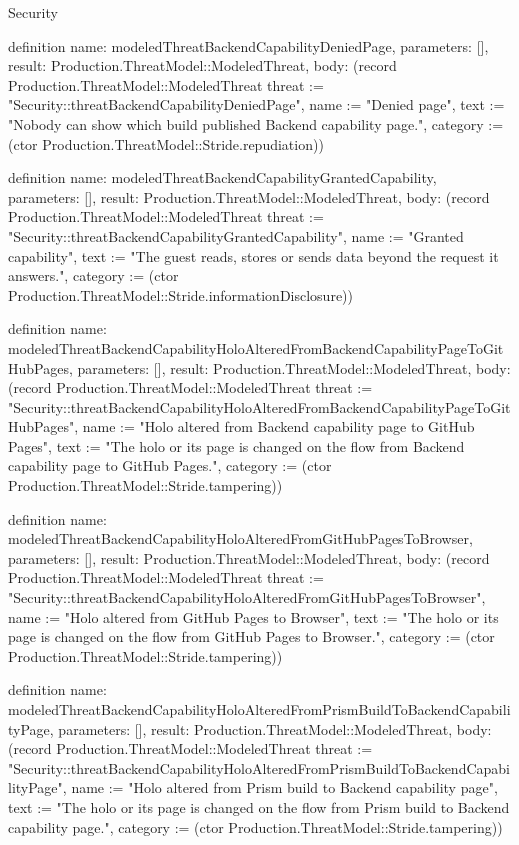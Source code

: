 \begin{lexlean}{Security}
\begin{semanticmodule}
definition{
  name: modeledThreatBackendCapabilityDeniedPage,
  parameters: [],
  result: Production.ThreatModel::ModeledThreat,
  body: (record Production.ThreatModel::ModeledThreat {threat := "Security::threatBackendCapabilityDeniedPage", name := "Denied page", text := "Nobody can show which build published Backend capability page.", category := (ctor Production.ThreatModel::Stride.repudiation)})
}

definition{
  name: modeledThreatBackendCapabilityGrantedCapability,
  parameters: [],
  result: Production.ThreatModel::ModeledThreat,
  body: (record Production.ThreatModel::ModeledThreat {threat := "Security::threatBackendCapabilityGrantedCapability", name := "Granted capability", text := "The guest reads, stores or sends data beyond the request it answers.", category := (ctor Production.ThreatModel::Stride.informationDisclosure)})
}

definition{
  name: modeledThreatBackendCapabilityHoloAlteredFromBackendCapabilityPageToGitHubPages,
  parameters: [],
  result: Production.ThreatModel::ModeledThreat,
  body: (record Production.ThreatModel::ModeledThreat {threat := "Security::threatBackendCapabilityHoloAlteredFromBackendCapabilityPageToGitHubPages", name := "Holo altered from Backend capability page to GitHub Pages", text := "The holo or its page is changed on the flow from Backend capability page to GitHub Pages.", category := (ctor Production.ThreatModel::Stride.tampering)})
}

definition{
  name: modeledThreatBackendCapabilityHoloAlteredFromGitHubPagesToBrowser,
  parameters: [],
  result: Production.ThreatModel::ModeledThreat,
  body: (record Production.ThreatModel::ModeledThreat {threat := "Security::threatBackendCapabilityHoloAlteredFromGitHubPagesToBrowser", name := "Holo altered from GitHub Pages to Browser", text := "The holo or its page is changed on the flow from GitHub Pages to Browser.", category := (ctor Production.ThreatModel::Stride.tampering)})
}

definition{
  name: modeledThreatBackendCapabilityHoloAlteredFromPrismBuildToBackendCapabilityPage,
  parameters: [],
  result: Production.ThreatModel::ModeledThreat,
  body: (record Production.ThreatModel::ModeledThreat {threat := "Security::threatBackendCapabilityHoloAlteredFromPrismBuildToBackendCapabilityPage", name := "Holo altered from Prism build to Backend capability page", text := "The holo or its page is changed on the flow from Prism build to Backend capability page.", category := (ctor Production.ThreatModel::Stride.tampering)})
}


\end{semanticmodule}
\end{lexlean}

